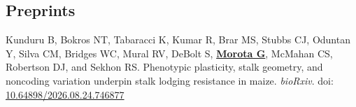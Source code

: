 \documentclass[margin,line,10pt]{res}
\newenvironment{list1}{
  \begin{list}{\ding{113}}{%
      \setlength{\itemsep}{0in}
      \setlength{\parsep}{0in} \setlength{\parskip}{0in}
      \setlength{\topsep}{0in} \setlength{\partopsep}{0in} 
      \setlength{\leftmargin}{0.17in}}}{\end{list}}
\begin{document}
\begin{resume}

\vspace{0.5cm}
\section{\sc Preprints}
\begin{list1}


  \item  [{\bf 1}.] Kunduru B, Bokros NT, Tabaracci K, Kumar R, Brar MS, Stubbs CJ, Oduntan Y, Silva CM, Bridges WC, Mural RV, DeBolt S, \textbf{\underline{Morota G}}, McMahan CS, Robertson DJ, and Sekhon RS. Phenotypic plasticity, stalk geometry, and noncoding variation underpin stalk lodging resistance in maize.  \emph{bioRxiv}. doi: \textcolor{blue}{\href{https://doi.org/10.64898/2026.08.24.746877}{10.64898/2026.08.24.746877}}
  

\end{list1}
\end{resume}
\end{document}
